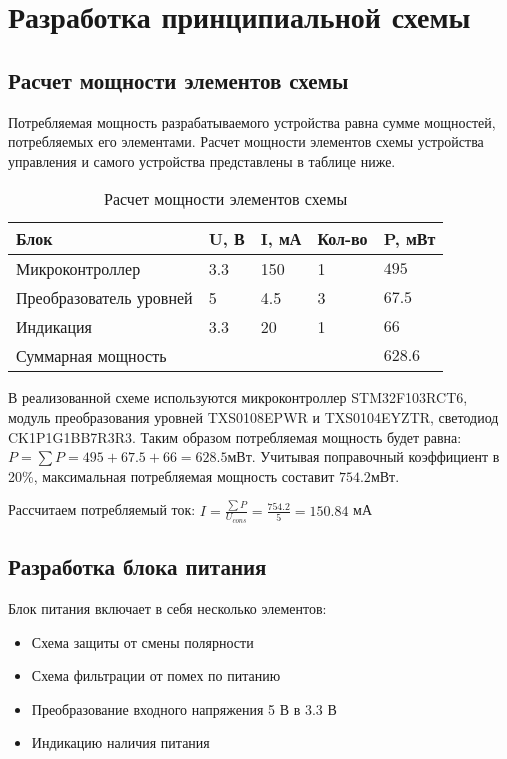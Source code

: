 \section{Разработка принципиальной схемы}
\label{sec:principal}

\subsection{Расчет мощности элементов схемы}
Потребляемая мощность разрабатываемого устройства равна сумме мощностей, потребляемых его элементами. Расчет мощности элементов схемы устройства управления и самого устройства представлены в таблице ниже.

\begin{table}[ht]
    \caption{Расчет мощности элементов схемы}
    \label{table:power_calc}
    \begin{tabular}{|llll|l|}
        \hline
        \multicolumn{1}{|l|}{Блок}                    & \multicolumn{1}{l|}{U, В} & \multicolumn{1}{l|}{I, мА} & Кол-во & P, мВт  \\ \hline
        \multicolumn{1}{|l|}{Микроконтроллер}         & \multicolumn{1}{l|}{3.3}  & \multicolumn{1}{l|}{150}   & 1      & $495$   \\ \hline
        \multicolumn{1}{|l|}{Преобразователь уровней} & \multicolumn{1}{l|}{5}    & \multicolumn{1}{l|}{4.5}   & 3      & $67.5$  \\ \hline
        \multicolumn{1}{|l|}{Индикация}               & \multicolumn{1}{l|}{3.3}  & \multicolumn{1}{l|}{20}    & 1      & $66$    \\ \hline
        \multicolumn{4}{|l|}{Суммарная мощность}                                                                        & $628.6$ \\ \hline
    \end{tabular}
\end{table}

В реализованной схеме используются микроконтроллер STM32F103RCT6, модуль преобразования уровней TXS0108EPWR и TXS0104EYZTR, светодиод CK1P1G1BB7R3R3. Таким образом потребляемая мощность будет равна: \(P = \sum P = 495 + 67.5 + 66 = 628.5\)мВт. Учитывая поправочный коэффициент в 20\%, максимальная потребляемая мощность составит \(754.2 мВт\).

Рассчитаем потребляемый ток:
\(I=\frac{\sum P}{U_{cons}}=\frac{754.2}{5}=150.84\) мА

\subsection{Разработка блока питания}
Блок питания включает в себя несколько элементов:
\begin{itemize}
    \item Схема защиты от смены полярности
    \item Схема фильтрации от помех по питанию
    \item Преобразование входного напряжения 5 В в 3.3 В
    \item Индикацию наличия питания
\end{itemize}


